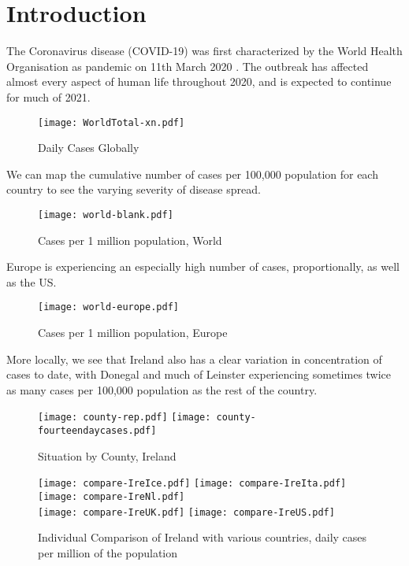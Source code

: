 \section{Introduction}
\label{ch:intro}

The Coronavirus disease (COVID-19) was first characterized by the World Health Organisation as pandemic on 11th March 2020 \cite{whodeclare20}. The outbreak has affected almost every aspect of human life throughout 2020, and is expected to continue for much of 2021. 

\begin{figure}[H]
\texttt{[image: WorldTotal-xn.pdf]}
\caption{Daily Cases Globally}
\end{figure}

We can map the cumulative number of cases per 100,000 population for each country to see the varying severity of disease spread. 

\begin{figure}[H]
\texttt{[image: world-blank.pdf]}
\caption{Cases per 1 million population, World}
\end{figure}

Europe is experiencing an especially high number of cases, proportionally, as well as the US.

\begin{figure}[H]
\texttt{[image: world-europe.pdf]}
\caption{Cases per 1 million population,  Europe}
\end{figure}

More locally, we see that Ireland also has a clear variation in concentration of cases to date, with Donegal and much of Leinster experiencing sometimes twice as many cases per 100,000 population as the rest of the country.

\begin{figure}[H]
\texttt{[image: county-rep.pdf]}
\endminipage\hfill
{}
\texttt{[image: county-fourteendaycases.pdf]}
\endminipage
\caption{Situation by County, Ireland}
\end{figure}

\begin{figure}[H]
\texttt{[image: compare-IreIce.pdf]}
\endminipage\hfill
{}
\texttt{[image: compare-IreIta.pdf]}
\endminipage\hfill
{}
\texttt{[image: compare-IreNl.pdf]}
\endminipage \\
\texttt{[image: compare-IreUK.pdf]}
\endminipage\hfill
{}
\texttt{[image: compare-IreUS.pdf]}
\endminipage
\caption{Individual Comparison of Ireland with various countries, daily cases per million of the population}
\end{figure}

